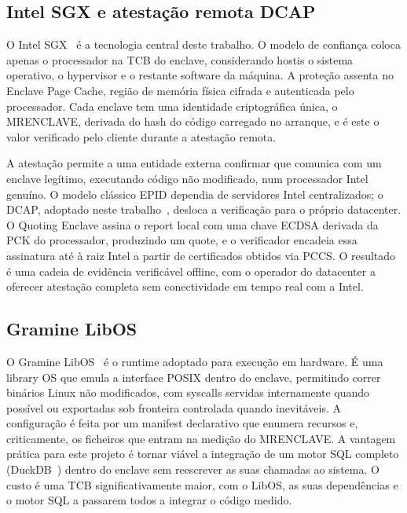 \subsection{Intel SGX e atestação remota DCAP}

O Intel SGX~\cite{costan2016sgx,anati2013innovative} é a tecnologia central deste trabalho. O modelo de confiança coloca apenas o processador na TCB do enclave, considerando hostis o sistema operativo, o hypervisor e o restante software da máquina. A proteção assenta no Enclave Page Cache, região de memória física cifrada e autenticada pelo processador. Cada enclave tem uma identidade criptográfica única, o MRENCLAVE, derivada do hash do código carregado no arranque, e é este o valor verificado pelo cliente durante a atestação remota.

A atestação permite a uma entidade externa confirmar que comunica com um enclave legítimo, executando código não modificado, num processador Intel genuíno. O modelo clássico EPID dependia de servidores Intel centralizados; o DCAP, adoptado neste trabalho~\cite{intel2018dcap}, desloca a verificação para o próprio datacenter. O Quoting Enclave assina o report local com uma chave ECDSA derivada da PCK do processador, produzindo um quote, e o verificador encadeia essa assinatura até à raiz Intel a partir de certificados obtidos via PCCS. O resultado é uma cadeia de evidência verificável offline, com o operador do datacenter a oferecer atestação completa sem conectividade em tempo real com a Intel.

\subsection{Gramine LibOS}

O Gramine LibOS~\cite{tsai2017graphene,gramine_project} é o runtime adoptado para execução em hardware. É uma library OS que emula a interface POSIX dentro do enclave, permitindo correr binários Linux não modificados, com syscalls servidas internamente quando possível ou exportadas sob fronteira controlada quando inevitáveis. A configuração é feita por um manifest declarativo que enumera recursos e, criticamente, os ficheiros que entram na medição do MRENCLAVE. A vantagem prática para este projeto é tornar viável a integração de um motor SQL completo (DuckDB~\cite{raasveldt2019duckdb}) dentro do enclave sem reescrever as suas chamadas ao sistema. O custo é uma TCB significativamente maior, com o LibOS, as suas dependências e o motor SQL a passarem todos a integrar o código medido.

